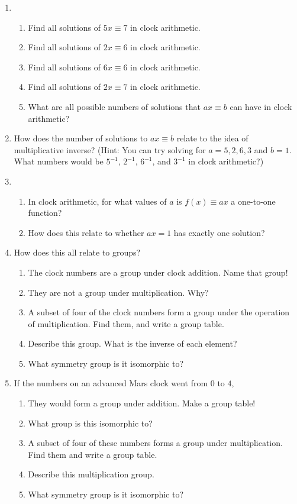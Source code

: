 \documentclass[../gatm.tex]{subfiles}
\begin{document}
\begin{enumerate}
\setcounter{enumi}{\value{problem_i}}
\item \begin{enumerate}
\item Find all solutions of $5x\equiv 7$ in clock arithmetic.
\item Find all solutions of $2x\equiv 6$ in clock arithmetic.
\item Find all solutions of $6x\equiv 6$ in clock arithmetic.
\item Find all solutions of $2x\equiv 7$ in clock arithmetic.
\item What are all possible numbers of solutions that $ax\equiv b$ can have in clock arithmetic?
\end{enumerate}
\item How does the number of solutions to $ax\equiv b$ relate to the idea of multiplicative inverse? (Hint: You can try solving for $a=5,2,6,3$ and $b=1$. What numbers would be $5^{-1}$, $2^{-1}$, $6^{-1}$, and $3^{-1}$ in clock arithmetic?)
\item \begin{enumerate}
\item In clock arithmetic, for what values of $a$ is $f(x)\equiv ax$ a one-to-one function?
\item How does this relate to whether $ax=1$ has exactly one solution?
\end{enumerate}
\item How does this all relate to groups?
\begin{enumerate}
\item The clock numbers are a group under clock addition. Name that group!
\item They are not a group under multiplication. Why?
\item A subset of four of the clock numbers form a group under the operation of multiplication. Find them, and write a group table.
\item Describe this group. What is the inverse of each element?
\item What symmetry group is it isomorphic to?
\end{enumerate}
\item If the numbers on an advanced Mars clock went from $0$ to $4$,
\begin{enumerate}
\item They would form a group under addition. Make a group table!
\item What group is this isomorphic to?
\item A subset of four of these numbers forms a group under multiplication. Find them and write a group table.
\item Describe this multiplication group.
\item What symmetry group is it isomorphic to?
\end{enumerate}
\setcounter{problem_i}{\value{enumi}}
\end{enumerate}
\end{document}
